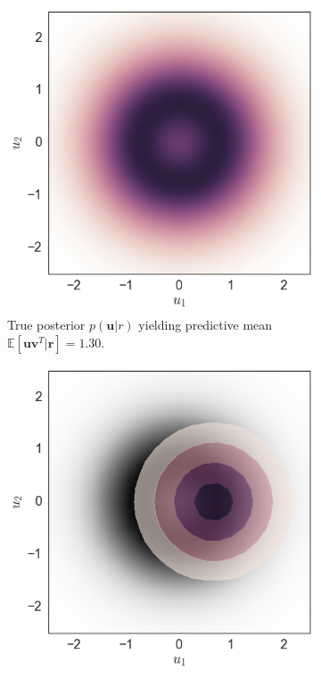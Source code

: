 \documentclass{article}
\newcommand{\E}{\mathbb{E}}
\renewcommand{\v}[1]{\mathbf{#1}}
\begin{document}
\begin{figure}[t]
\centering
\begin{subfigure}[t]{.3\textwidth}
\includegraphics[width=\textwidth]{rot_bayes_posterior}
\caption{True posterior $p(\v{u} | r)$ yielding
  predictive mean $\E[\v{u}\v{v}^T|\v{r}] = 1.30$.}
\end{subfigure}
\begin{subfigure}[t]{.3\textwidth}
\includegraphics[width=\textwidth]{rot_mfvb_posterior}

\end{subfigure}
\end{figure}
\end{document}

